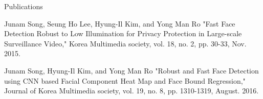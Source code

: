 \documentclass{resume}
\begin{document}
\begin{rSection}{Publications}
 \item Junam Song, Seung Ho Lee, Hyung-Il Kim, and Yong Man Ro "Fast Face Detection Robust to Low Illumination for Privacy Protection in Large-scale Surveillance Video," Korea Multimedia society, vol. 18, no. 2, pp. 30-33, Nov. 2015.
  \item Junam Song, Hyung-Il Kim, and Yong Man Ro "Robust and Fast Face Detection using CNN based Facial Component Heat Map and Face Bound Regression," Journal of Korea Multimedia society, vol. 19, no. 8, pp. 1310-1319, August. 2016.
\end{rSection}
\end{document}
